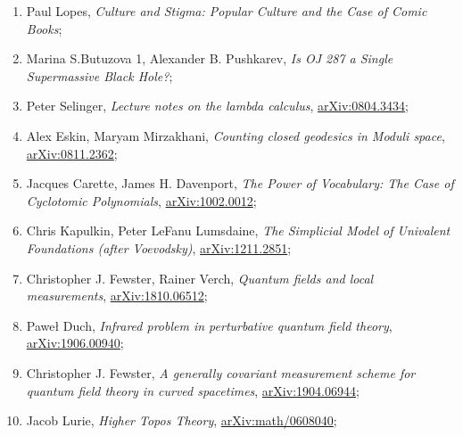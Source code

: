\documentclass[a4paper,11pt]{article}
\begin{document}
\begin{enumerate}
\item Paul Lopes, \textit{Culture and Stigma: Popular Culture and the
    Case of Comic Books};



\item Marina S.Butuzova 1, Alexander B. Pushkarev, \textit{Is OJ 287 a
    Single Supermassive Black Hole?};



\item Peter Selinger, \textit{Lecture notes on the lambda calculus},
  \href{https://arxiv.org/abs/0804.3434v2}{arXiv:0804.3434};



\item Alex Eskin, Maryam Mirzakhani, \textit{Counting closed geodesics
    in Moduli space},
  \href{https://arxiv.org/abs/0811.2362v3}{arXiv:0811.2362};



\item Jacques Carette, James H. Davenport, \textit{The Power of
    Vocabulary: The Case of Cyclotomic Polynomials},
  \href{https://arxiv.org/abs/1002.0012v1}{arXiv:1002.0012};



\item Chris Kapulkin, Peter LeFanu Lumsdaine, \textit{The Simplicial
    Model of Univalent Foundations (after Voevodsky)},
  \href{https://arxiv.org/abs/1211.2851v5}{arXiv:1211.2851};



\item Christopher J. Fewster, Rainer Verch, \textit{Quantum fields and
    local measurements},
  \href{https://arxiv.org/abs/1810.06512}{arXiv:1810.06512};



\item Paweł Duch, \textit{Infrared problem in perturbative quantum
    field theory},
  \href{https://arxiv.org/abs/1906.00940}{arXiv:1906.00940};



\item Christopher J. Fewster, \textit{A generally covariant
    measurement scheme for quantum field theory in curved spacetimes},
  \href{https://arxiv.org/abs/1904.06944v1}{arXiv:1904.06944};



\item Jacob Lurie, \textit{Higher Topos Theory},
  \href{https://arxiv.org/abs/math/0608040v4}{arXiv:math/0608040};




\end{enumerate}
\end{document}
